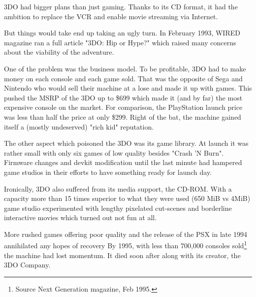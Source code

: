 \par
 3DO had bigger plans than just gaming. Thanks to its CD format, it had the ambition to replace the VCR and enable movie streaming via Internet.\\
\par
But things would take end up taking an ugly turn. In February 1993, WIRED magazine ran a full article "3DO: Hip or Hype?" which raised many concerns about the viability of the adventure.\\
\par
One of the problem was the business model. To be profitable, 3DO had to make money on each console and each game sold. That was the opposite of Sega and Nintendo who would sell their machine at a lose and made it up with games. This pushed the MSRP of the 3DO up to \$699 which made it (and by far) the most expensive console on the market. For comparison, the PlayStation launch price was less than half the price at only \$299. Right of the bat, the machine gained itself a (mostly undeserved) "rich kid" reputation.\\
\par
The other aspect which poisoned the 3DO was its game library. At launch it was rather small with only six games of low quality besides "Crash 'N Burn". Firmware changes and devkit modification until the last minute had hampered game studios in their efforts to have something ready for launch day.\\
\par
Ironically, 3DO also suffered from its media support, the CD-ROM. With a capacity more than 15 times superior to what they were used (650 MiB vs 4MiB) game studio experimented with lengthy pixelated cut-scenes and borderline interactive movies which turned out not fun at all.\\
\par
More rushed games offering poor quality and the release of the PSX in late 1994 annihilated any hopes of recovery
By 1995, with less than 700,000 consoles sold\footnote{Source Next Generation magazine, Feb 1995.} the machine had lost momentum. It died soon after along with its creator, the 3DO Company.






